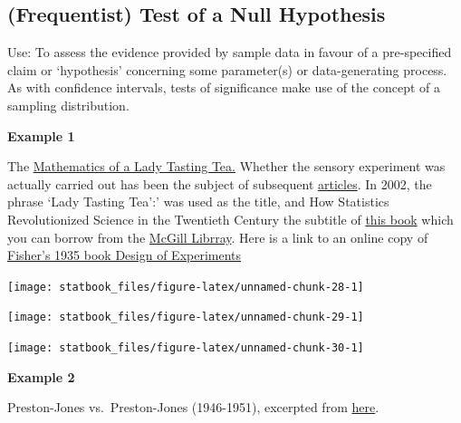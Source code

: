 \documentclass[]{book}
\begin{document}
\hypertarget{frequentist-test-of-a-null-hypothesis}{%
\subsection{(Frequentist) Test of a Null Hypothesis}\label{frequentist-test-of-a-null-hypothesis}}

Use: To assess the evidence provided by sample data in favour of a pre-specified claim or `hypothesis' concerning some parameter(s) or data-generating process. As with confidence intervals, tests of significance make use of the concept of a sampling distribution.

\textbf{Example 1}

The \href{http://www.medicine.mcgill.ca/epidemiology/hanley/c607/ch06/lady_tasting_tea.pdf}{Mathematics of a Lady Tasting Tea.} Whether the sensory experiment was actually carried out has been the subject of subsequent \href{https://rss.onlinelibrary.wiley.com/doi/full/10.1111/j.1740-9713.2012.00620.x}{articles}. In 2002, the phrase `Lady Tasting Tea':' was used as the title, and How Statistics Revolutionized Science in the Twentieth Century the subtitle of \href{https://www.amazon.ca/Lady-Tasting-Tea-Statistics-Revolutionized/dp/0805071342}{this book} which you can borrow from the \href{https://mcgill.overdrive.com/media/E974A53B-3700-474A-9E11-9E8758435E70}{McGill Librray}.
Here is a link to an online copy of \href{https://www.phil.vt.edu/dmayo/PhilStatistics/b\%20Fisher\%20design\%20of\%20experiments.pdf}{Fisher's 1935 book Design of Experiments}

\begin{center}\texttt{[image: statbook\_files/figure-latex/unnamed-chunk-28-1]} \end{center}

\begin{center}\texttt{[image: statbook\_files/figure-latex/unnamed-chunk-29-1]} \end{center}

\begin{center}\texttt{[image: statbook\_files/figure-latex/unnamed-chunk-30-1]} \end{center}

\textbf{Example 2}

Preston-Jones vs.~Preston-Jones (1946-1951), excerpted from \href{https://learning.uonbi.ac.ke/courses/GPR201/document/Selected_Cases/Preston-Jones_v_Preston-Jones_-Human_Gestation_Period-.pdf}{here}.
\end{document}
